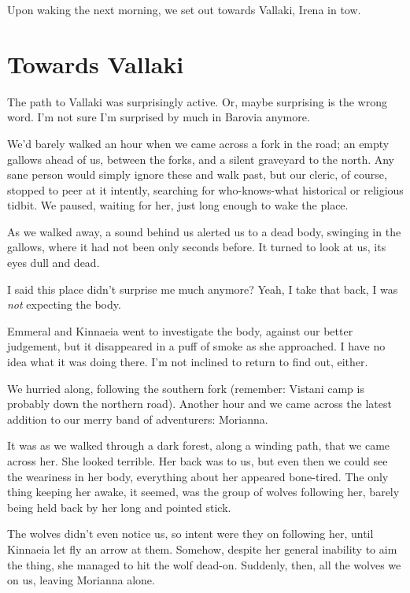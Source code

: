 
Upon waking the next morning, we set out towards Vallaki, Irena in tow.

\section*{Towards Vallaki}
The path to Vallaki was surprisingly active. Or, maybe surprising is the wrong word. I'm not sure I'm surprised by much in Barovia anymore.

We'd barely walked an hour when we came across a fork in the road; an empty gallows ahead of us, between the forks, and a silent graveyard to the north. Any sane person would simply ignore these and walk past, but our cleric, of course, stopped to peer at it intently, searching for who-knows-what historical or religious tidbit. We paused, waiting for her, just long enough to wake the place.

As we walked away, a sound behind us alerted us to a dead body, swinging in the gallows, where it had not been only seconds before. It turned to look at us, its eyes dull and dead.

I said this place didn't surprise me much anymore? Yeah, I take that back, I was \emph{not} expecting the body.

Emmeral and Kinnaeia went to investigate the body, against our better judgement, but it disappeared in a puff of smoke as she approached. I have no idea what it was doing there. I'm not inclined to return to find out, either.

We hurried along, following the southern fork (remember: Vistani camp is probably down the northern road). Another hour and we came across the latest addition to our merry band of adventurers: Morianna.

It was as we walked through a dark forest, along a winding path, that we came across her. She looked terrible. Her back was to us, but even then we could see the weariness in her body, everything about her appeared bone-tired. The only thing keeping her awake, it seemed, was the group of wolves following her, barely being held back by her long and pointed stick.

The wolves didn't even notice us, so intent were they on following her, until Kinnaeia let fly an arrow at them. Somehow, despite her general inability to aim the thing, she managed to hit the wolf dead-on. Suddenly, then, all the wolves we on us, leaving Morianna alone.

